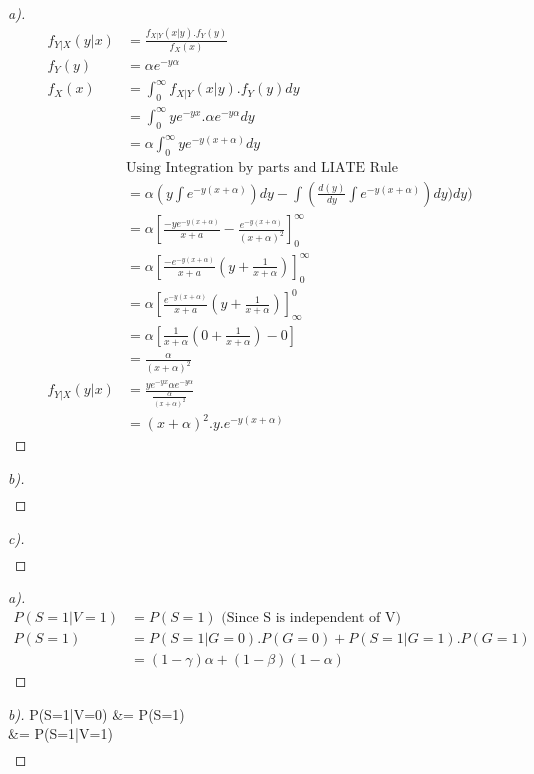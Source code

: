 \documentclass[12pt]{article}
\newenvironment{theorem}[2][Theorem]{\begin{trivlist}
\item[\hskip \labelsep {\bfseries #1}\hskip \labelsep {\bfseries #2.}]}{\end{trivlist}}
\begin{document}
\pagebreak
\begin{theorem}[Ans]{4}
\begin{proof}[a)]
\begin{align*}
f_{Y|X}(y|x) &= \frac{f_{X|Y}(x|y).f_{Y}(y)}{f_{X}(x)}\\
f_{Y}(y) &= \alpha e^{-y\alpha}\\
f_{X}(x) &= \int_{0}^{\infty}f_{X|Y}(x|y).f_{Y}(y)dy\\
&= \int_{0}^{\infty} ye^{-yx}.\alpha e^{-y\alpha} dy\\
&= \alpha \int_{0}^{\infty}ye^{-y(x+\alpha)}dy\\
&\text{Using Integration by parts and LIATE Rule}\\
&= \alpha(y\int e^{-y(x+\alpha)})dy - \int (\frac{d(y)}{dy}\int e^{-y(x+\alpha)})dy)dy)\\
&= \alpha[\frac{-ye^{-y(x+\alpha)}}{x+a}-\frac{e^{-y(x+\alpha)}}{(x+\alpha)^{2}}]_{0}^{\infty}\\
&= \alpha[\frac{-e^{-y(x+\alpha)}}{x+a}(y+\frac{1}{x+\alpha})]_{0}^{\infty}\\
&= \alpha[\frac{e^{-y(x+\alpha)}}{x+a}(y+\frac{1}{x+\alpha})]_{\infty}^{0}\\
&= \alpha[\frac{1}{x+\alpha}(0+\frac{1}{x+\alpha})-0]\\
&= \frac{\alpha}{(x+\alpha)^{2}}\\
f_{Y|X}(y|x) &= \frac{ye^{-yx}\alpha e^{-y\alpha}}{\frac{\alpha}{(x+\alpha)^{2}}}\\
&= (x+\alpha)^2.y.e^{-y(x+\alpha)}
\end{align*}
\end{proof}
\begin{proof}[b)]
\begin{align*}
\end{align*}
\end{proof}
\begin{proof}[c)]
\begin{align*}
\end{align*}
\end{proof}
\end{theorem}
\pagebreak
\begin{theorem}[Ans]{5}
\begin{proof}[a)]
\begin{align*}
P(S=1|V=1) &= P(S=1) \text{ (Since S is independent of V)}\\
P(S=1) &= P(S=1|G=0).P(G=0)+P(S=1|G=1).P(G=1)\\
&= (1-\gamma)\alpha+(1-\beta)(1-\alpha)
\end{align*}
\end{proof}
\begin{proof}[b)]
P(S=1|V=0)  &= P(S=1) \\
&= P(S=1|V=1)\\
\begin{align*}
\end{align*}
\end{proof}
\end{theorem}
\end{document}
